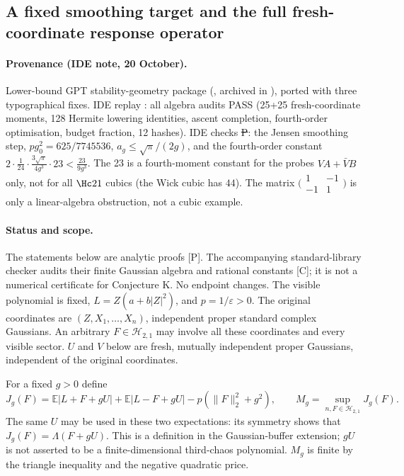 \subsection{A fixed smoothing target and the full fresh-coordinate response operator}
\label{sec:k-fixed-smoothing-response}

\paragraph{Provenance (IDE note, 20 October).} Lower-bound GPT stability-geometry package (, archived in
), ported with three typographical fixes. IDE replay : all algebra audits PASS
(25+25 fresh-coordinate moments, 128 Hermite lowering identities, ascent completion, fourth-order optimisation, budget fraction, 12 hashes). IDE checks \st{P}: the
Jensen smoothing step, $pg_0^2=625/7745536$, $a_g\le\sqrt\pi/(2g)$, and the fourth-order constant $2\cdot\frac1{24}\cdot\frac{3\sqrt\pi}{4g^3}\cdot23<\frac{23}{9g^3}$.
The 23 is a fourth-moment constant for the probes $VA+\bar VB$ only, not for all $\Hc21$ cubics (the Wick cubic has $44$). The matrix
$\bigl(\begin{smallmatrix}1&-1\\-1&1\end{smallmatrix}\bigr)$ is only a linear-algebra obstruction, not a cubic example.

\paragraph{Status and scope.}
The statements below are analytic proofs [P]. The accompanying standard-library
checker audits their finite Gaussian algebra and rational constants [C]; it is
not a numerical certificate for Conjecture K. No endpoint changes. The visible
polynomial is fixed, $L=Z(a+b|Z|^2)$, and $p=1/\varepsilon>0$.
The original coordinates are $(Z,X_1,\ldots,X_n)$, independent proper standard
complex Gaussians. An arbitrary $F\in\mathcal H_{2,1}$ may involve all these
coordinates and every visible sector. $U$ and $V$ below are fresh, mutually
independent proper Gaussians, independent of the original coordinates.

For a fixed $g>0$ define
\[
 J_g(F)=\mathbb E|L+F+gU|+\mathbb E|L-F+gU|
          -p(\|F\|_2^2+g^2),\qquad
 M_g=\sup_{n,F\in\mathcal H_{2,1}}J_g(F).
\]
The same $U$ may be used in these two expectations: its symmetry shows that
$J_g(F)=\Lambda(F+gU)$. This is a definition in the Gaussian-buffer extension;
$gU$ is not asserted to be a finite-dimensional third-chaos polynomial.
$M_g$ is finite by the triangle inequality and the negative quadratic price.

